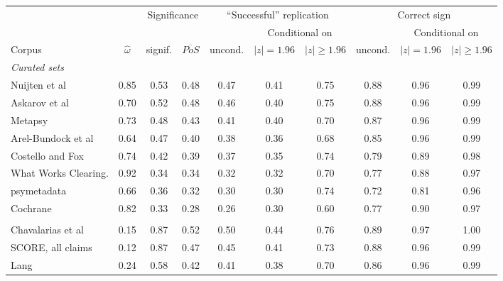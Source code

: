 \begin{table}
\centering
\scriptsize
\begin{tabular}{lccccccccc}
\multicolumn{2}{c}{}
& \multicolumn{2}{c}{Significance}
& \multicolumn{3}{c}{``Successful'' replication}
& \multicolumn{3}{c}{Correct sign} \\
\cmidrule(lr){3-4}\cmidrule(lr){5-7}\cmidrule(lr){8-10}
& & & & & \multicolumn{2}{c}{\scriptsize Conditional on}
& & \multicolumn{2}{c}{\scriptsize Conditional on} \\
Corpus & \multicolumn{1}{c}{\scriptsize $\hat\omega$}
        & \multicolumn{1}{c}{\scriptsize signif.}
        & \multicolumn{1}{c}{\scriptsize $\overline{PoS}$}
        & \multicolumn{1}{c}{\scriptsize uncond.}
        & \multicolumn{1}{c}{\scriptsize $|z| = 1.96$}
        & \multicolumn{1}{c}{\scriptsize $|z| \geq 1.96$}
        & \multicolumn{1}{c}{\scriptsize uncond.}
        & \multicolumn{1}{c}{\scriptsize $|z| = 1.96$}
        & \multicolumn{1}{c}{\scriptsize $|z| \geq 1.96$} \\
\cmidrule(lr){1-10}
\multicolumn{10}{l}{\emph{Curated sets}}\\
\cmidrule(lr){1-10}
Nuijten et al & 0.85 & 0.53 & 0.48 & 0.47 & 0.41 & 0.75 & 0.88 & 0.96 & 0.99\\
Askarov et al & 0.70 & 0.52 & 0.48 & 0.46 & 0.40 & 0.75 & 0.88 & 0.96 & 0.99\\
Metapsy & 0.73 & 0.48 & 0.43 & 0.41 & 0.40 & 0.70 & 0.87 & 0.96 & 0.99\\
Arel-Bundock et al & 0.64 & 0.47 & 0.40 & 0.38 & 0.36 & 0.68 & 0.85 & 0.96 & 0.99\\
Costello and Fox & 0.74 & 0.42 & 0.39 & 0.37 & 0.35 & 0.74 & 0.79 & 0.89 & 0.98\\
What Works Clearing. & 0.92 & 0.34 & 0.34 & 0.32 & 0.32 & 0.70 & 0.77 & 0.88 & 0.97\\
psymetadata & 0.66 & 0.36 & 0.32 & 0.30 & 0.30 & 0.74 & 0.72 & 0.81 & 0.96\\
Cochrane & 0.82 & 0.33 & 0.28 & 0.26 & 0.30 & 0.60 & 0.77 & 0.90 & 0.97\\
\addlinespace
\cmidrule(lr){1-10}
\multicolumn{10}{l}{\emph{Representative domain samples}}\\
\cmidrule(lr){1-10}
Chavalarias et al & 0.15 & 0.87 & 0.52 & 0.50 & 0.44 & 0.76 & 0.89 & 0.97 & 1.00\\
SCORE, all claims & 0.12 & 0.87 & 0.47 & 0.45 & 0.41 & 0.73 & 0.88 & 0.96 & 0.99\\
Lang & 0.24 & 0.58 & 0.42 & 0.41 & 0.38 & 0.70 & 0.86 & 0.96 & 0.99\\

\end{tabular}
\end{table}
